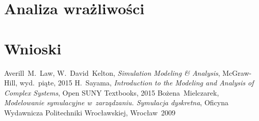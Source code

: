 \documentclass[12pt, a4paper, oneside]{mwart} %
\begin{document}
\section{Analiza wrażliwości}

\section{Wnioski}

\begin{thebibliography}{9}
Averill~M.~Law, W.~David~Kelton,
\emph{Simulation Modeling \& Analysis},
McGraw-Hill, wyd.~piąte, 2015
H.~Sayama, \emph{Introduction to the Modeling and Analysis of Complex Systems},
Open SUNY Textbooks, 2015
Bożena~Mielczarek, \emph{Modelowanie symulacyjne w~zarządzaniu. Symulacja dyskretna},
Oficyna Wydawnicza Politechniki Wrocławskiej, Wrocław~2009
\end{thebibliography}
\end{document}

